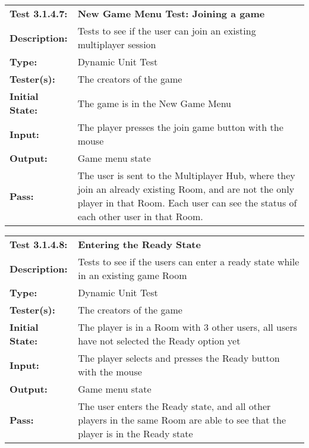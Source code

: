 \documentclass[12pt, titlepage]{article}
\begin{document}
\begin{enumerate}
\begin{mdframed}[linewidth=1pt]
\begin{tabularx}{\textwidth}{@{}p{3cm}X@{}}
{\bf Test 3.1.4.7:} & {\bf New Game Menu Test: Joining a game}\\[\baselineskip]
{\bf Description:} & Tests to see if the user can join an existing multiplayer session\\[0.5\baselineskip]
{\bf Type:} & Dynamic Unit Test\\[0.5\baselineskip]
{\bf Tester(s):} & The creators of the game\\[0.5\baselineskip]
{\bf Initial State:} & The game is in the New Game Menu\\[0.5\baselineskip]
{\bf Input:} & The player presses the join game button with the mouse \\[0.5\baselineskip]
{\bf Output:} & Game menu state\\[0.5\baselineskip]
{\bf Pass:} & The user is sent to the Multiplayer Hub, where they join an already existing Room, and are not the only player in that Room. Each user can see the status of each other user in that Room.
\end{tabularx}
\end{mdframed}

\begin{mdframed}[linewidth=1pt]
\begin{tabularx}{\textwidth}{@{}p{3cm}X@{}}
{\bf Test 3.1.4.8:} & {\bf Entering the Ready State}\\[\baselineskip]
{\bf Description:} & Tests to see if the users can enter a ready state while in an existing game Room\\[0.5\baselineskip]
{\bf Type:} & Dynamic Unit Test\\[0.5\baselineskip]
{\bf Tester(s):} & The creators of the game\\[0.5\baselineskip]
{\bf Initial State:} & The player is in a Room with 3 other users, all users have not selected the Ready option yet\\[0.5\baselineskip]
{\bf Input:} & The player selects and presses the Ready button with the mouse \\[0.5\baselineskip]
{\bf Output:} & Game menu state\\[0.5\baselineskip]
{\bf Pass:} & The user enters the Ready state, and all other players in the same Room are able to see that the player is in the Ready state
\end{tabularx}
\end{mdframed}


\end{enumerate}
\end{document}

